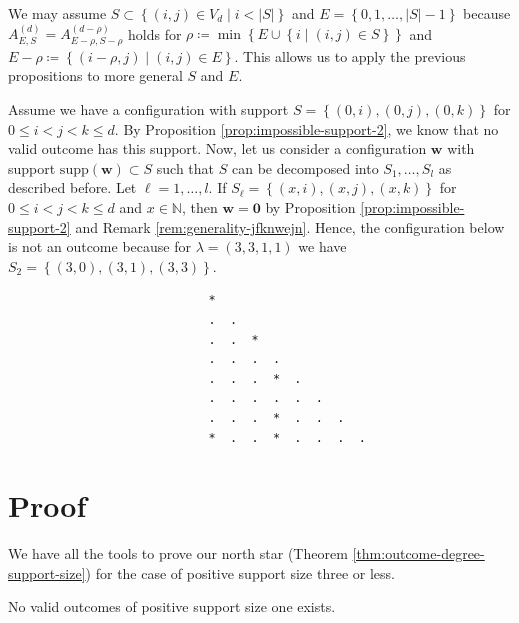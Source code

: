 \begin{remark}\label{rem:generality-jfknwejn}
    We may assume \(  S \subset \left\{ (i,j) \in V_d \mid i < \lvert S \rvert \right\} \) and \( E = \left\{ 0,1, \dots, \lvert S \rvert - 1 \right\} \)
because \( A^{(d)}_{E,S} = A^{(d-\rho)}_{E - \rho, S - \rho} \) holds for \( \rho \coloneqq \min \left\{ E \cup \left\{ i \mid (i,j) \in S \right\} \right\} \) and \( E - \rho \coloneqq \left\{ (i - \rho, j) \mid (i,j) \in E \right\} \). This allows us to apply the previous propositions to more general \( S \) and \( E \).
\end{remark}

\begin{example}
    Assume we have a configuration with support \( S = \left\{ (0,i), (0,j), (0,k) \right\} \) for \( 0 \leq i < j< k \leq d \). By Proposition \ref{prop:impossible-support-2}, we know that no valid outcome has this support. Now, let us consider a configuration \( \mathbf{w} \) with support \( \mathrm{supp}(\mathbf{w}) \subset S \) such that \( S \) can be decomposed into \( S_1, \dots, S_l \) as described before. Let \( \ell = 1, \dots, l \). If \( S_\ell = \left\{ (x,i), (x,j), (x,k) \right\} \) for \( 0 \leq i < j< k \leq d \) and \( x \in \mathbb{N} \), then \( \mathbf{w} = \mathbf 0 \) by Proposition \ref{prop:impossible-support-2} and Remark \ref{rem:generality-jfknwejn}. Hence, the configuration below is not an outcome because for \( \lambda = (3,3,1,1) \) we have \( S_2 = \left\{ (3,0), (3,1), (3,3) \right\} \).
    \begin{verbatim}
                            *
                            .  .
                            .  .  *  
                            .  .  .  .  
                            .  .  .  *  .  
                            .  .  .  .  .  .  
                            .  .  .  *  .  .  .  
                            *  .  .  *  .  .  .  .  
    \end{verbatim}
\end{example}

\section{Proof}

We have all the tools to prove our north star (Theorem \ref{thm:outcome-degree-support-size}) for the case of positive support size three or less.

\begin{theorem}\label{thm:outcome-degree-support-size-232323}
    No valid outcomes of positive support size one exists.
\end{theorem}



